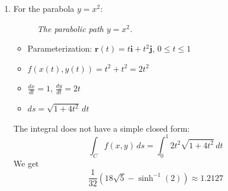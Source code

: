 \begin{example}
\begin{solution}
\begin{enumerate}
The integral over $C_1$ becomes:
\[
\int_{C_1} f(x,y)\,ds = \int_{\pi/2}^{\pi} (1 + 2\cos t + \cos^2 t + \sin t)\,dt = \frac{3\pi}{4} - 1 \approx 1.3562
\]

For $C_2$ (vertical line):
\begin{itemize}
\item Parameterization: $\mathbf{r}(t) = \mathbf{i} + t\mathbf{j}$, $0 \leq t \leq 1$
\item $f(x(t),y(t)) = 1 + t$
\item $ds = dt$
\end{itemize}

Therefore:
\begin{align*}
\int_{C_2} f(x,y)\,ds &= \int_0^1 (1 + t)\,dt \\
&= [t + \frac{t^2}{2}]_0^1 = \frac{3}{2}
\end{align*}

The total integral is the sum $\frac{3\pi}{4} - 1 + \frac{3}{2} \approx 2.8562.$

\item For the parabola $y = x^2$:

\begin{figure}[H]
\centering
{}
\caption{\textit{The parabolic path $y=x^2$.}}
\label{fig:parabola_path}
\end{figure}

\begin{itemize}
\item Parameterization: $\mathbf{r}(t) = t\mathbf{i} + t^2\mathbf{j}$, $0 \leq t \leq 1$
\item $f(x(t),y(t)) = t^2 + t^2 = 2t^2$
\item $\frac{dx}{dt} = 1$, $\frac{dy}{dt} = 2t$
\item $ds = \sqrt{1 + 4t^2}\,dt$
\end{itemize}

The integral does not have a simple closed form:
\[
\int_C f(x,y)\,ds = \int_0^1 2t^2\sqrt{1 + 4t^2}\,dt
\]
We get
\[
\frac{1}{32}\left(18\sqrt{5} - \sinh^{-1}(2)\right) \approx 1.2127
\]
\end{enumerate}
\end{solution}
\end{example}
\exampleline


